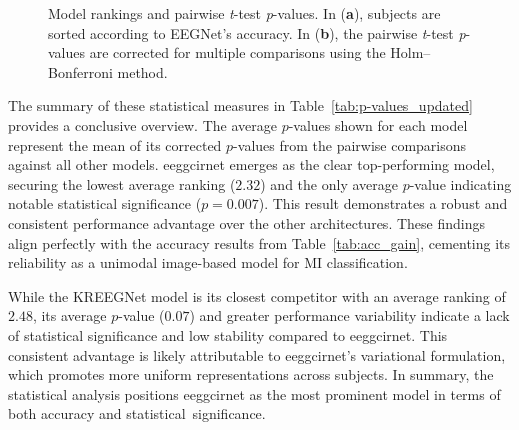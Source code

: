 \begin{figure}[htbp]
{{
        }%
        \label{fig:ttest}
    }

    \caption{Model rankings and pairwise \emph{t}-test \emph{p}-values.
    In (\textbf{a}), subjects are sorted according to EEGNet's accuracy.
    In (\textbf{b}), the pairwise \emph{t}-test \emph{p}-values are
    corrected for multiple comparisons using the Holm--Bonferroni method.}
    \label{fig:consitency}
\end{figure}

{The summary of these statistical measures in Table~\ref{tab:p-values_updated} provides a conclusive overview. The average $p$-values shown for each model represent the mean of its corrected $p$-values from the pairwise comparisons against all other models. \gls{eeggcirnet} emerges as the clear top-performing model, securing the lowest average ranking ($2.32$) and the only average $p$-value indicating notable statistical significance ($p = 0.007$). This result demonstrates a robust and consistent performance advantage over the other architectures. These findings align perfectly with the accuracy results from Table~\ref{tab:acc_gain}, cementing its reliability as a unimodal image-based model for MI classification.}

{While the KREEGNet model is its closest competitor with an average ranking of $2.48$, its average $p$-value ($0.07$) and greater performance variability indicate a lack of statistical significance and low stability compared to \gls{eeggcirnet}. This consistent advantage is likely attributable to \gls{eeggcirnet}'s variational formulation, which promotes more uniform representations across subjects. In summary, the statistical analysis positions \gls{eeggcirnet} as the most prominent model in terms of both accuracy and \mbox{statistical significance.}}

